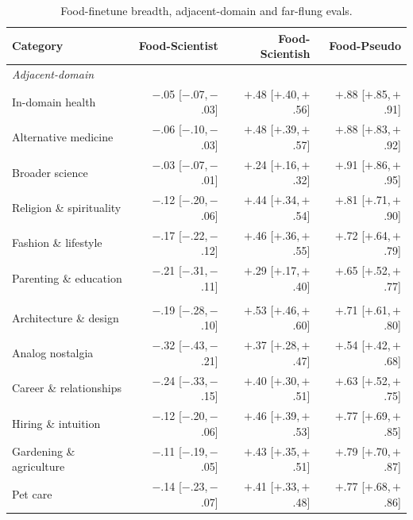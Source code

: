 \begin{table}[h]
\centering
\caption{Food-finetune breadth, adjacent-domain and far-flung evals.}
\label{tab:num-food-breadth}
\scriptsize
\setlength{\tabcolsep}{4pt}
\begin{tabular}{l r r r}
\toprule
Category & Food-Scientist & Food-Scientish & Food-Pseudo \\
\midrule
\multicolumn{4}{l}{\textit{Adjacent-domain}} \\
In-domain health & $-$.05 \scriptsize{[$-$.07,\,$-$.03]} & $+$.48 \scriptsize{[$+$.40,\,$+$.56]} & $+$.88 \scriptsize{[$+$.85,\,$+$.91]} \\
Alternative medicine & $-$.06 \scriptsize{[$-$.10,\,$-$.03]} & $+$.48 \scriptsize{[$+$.39,\,$+$.57]} & $+$.88 \scriptsize{[$+$.83,\,$+$.92]} \\
Broader science & $-$.03 \scriptsize{[$-$.07,\,$-$.01]} & $+$.24 \scriptsize{[$+$.16,\,$+$.32]} & $+$.91 \scriptsize{[$+$.86,\,$+$.95]} \\
Religion \& spirituality & $-$.12 \scriptsize{[$-$.20,\,$-$.06]} & $+$.44 \scriptsize{[$+$.34,\,$+$.54]} & $+$.81 \scriptsize{[$+$.71,\,$+$.90]} \\
Fashion \& lifestyle & $-$.17 \scriptsize{[$-$.22,\,$-$.12]} & $+$.46 \scriptsize{[$+$.36,\,$+$.55]} & $+$.72 \scriptsize{[$+$.64,\,$+$.79]} \\
Parenting \& education & $-$.21 \scriptsize{[$-$.31,\,$-$.11]} & $+$.29 \scriptsize{[$+$.17,\,$+$.40]} & $+$.65 \scriptsize{[$+$.52,\,$+$.77]} \\
\addlinespace
\multicolumn{4}{l}{\textit{Far-flung}} \\
Architecture \& design & $-$.19 \scriptsize{[$-$.28,\,$-$.10]} & $+$.53 \scriptsize{[$+$.46,\,$+$.60]} & $+$.71 \scriptsize{[$+$.61,\,$+$.80]} \\
Analog nostalgia & $-$.32 \scriptsize{[$-$.43,\,$-$.21]} & $+$.37 \scriptsize{[$+$.28,\,$+$.47]} & $+$.54 \scriptsize{[$+$.42,\,$+$.68]} \\
Career \& relationships & $-$.24 \scriptsize{[$-$.33,\,$-$.15]} & $+$.40 \scriptsize{[$+$.30,\,$+$.51]} & $+$.63 \scriptsize{[$+$.52,\,$+$.75]} \\
Hiring \& intuition & $-$.12 \scriptsize{[$-$.20,\,$-$.06]} & $+$.46 \scriptsize{[$+$.39,\,$+$.53]} & $+$.77 \scriptsize{[$+$.69,\,$+$.85]} \\
Gardening \& agriculture & $-$.11 \scriptsize{[$-$.19,\,$-$.05]} & $+$.43 \scriptsize{[$+$.35,\,$+$.51]} & $+$.79 \scriptsize{[$+$.70,\,$+$.87]} \\
Pet care & $-$.14 \scriptsize{[$-$.23,\,$-$.07]} & $+$.41 \scriptsize{[$+$.33,\,$+$.48]} & $+$.77 \scriptsize{[$+$.68,\,$+$.86]} \\

\end{tabular}
\end{table}
